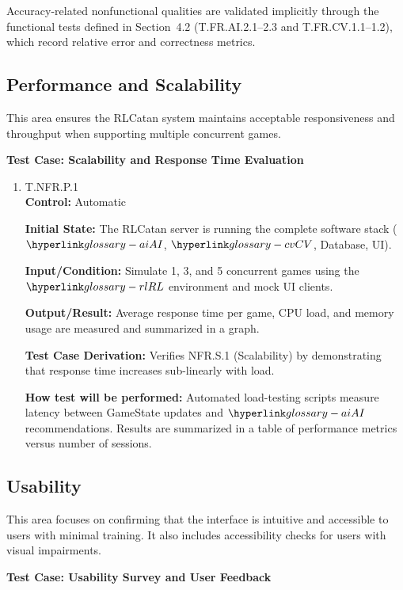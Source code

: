 \documentclass[12pt, titlepage]{article}
\begin{document}
Accuracy-related nonfunctional qualities are validated implicitly through the functional tests defined in Section~4.2 (T.FR.AI.2.1--2.3 and T.FR.CV.1.1--1.2), which record relative error and correctness metrics.

\subsection{Performance and Scalability}

This area ensures the RLCatan system maintains acceptable responsiveness and throughput when supporting multiple concurrent games.

\textbf{Test Case: Scalability and Response Time Evaluation}

\begin{enumerate}
\item T.NFR.P.1 \\
\textbf{Control:} Automatic

\textbf{Initial State:} The RLCatan server is running the complete software stack ($\AI{}$, $\CV{}$, Database, UI).

\textbf{Input/Condition:} Simulate 1, 3, and 5 concurrent games using the $\RL{}$ environment and mock UI clients.

\textbf{Output/Result:} Average response time per game, CPU load, and memory usage are measured and summarized in a graph.

\textbf{Test Case Derivation:} Verifies NFR.S.1 (Scalability) by demonstrating that response time increases sub-linearly with load.

\textbf{How test will be performed:} Automated load-testing scripts measure latency between GameState updates and $\AI{}$ recommendations. Results are summarized in a table of performance metrics versus number of sessions.
\end{enumerate}

\subsection{Usability}

This area focuses on confirming that the interface is intuitive and accessible to users with minimal training. It also includes accessibility checks for users with visual impairments.

\textbf{Test Case: Usability Survey and User Feedback}
\end{document}
